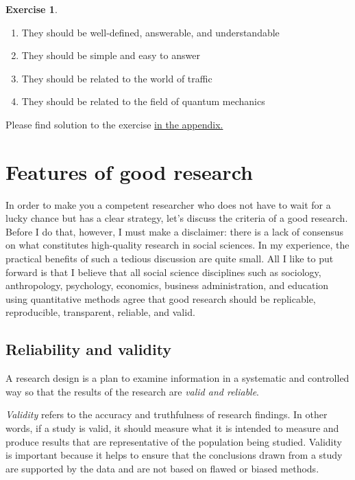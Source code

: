 \documentclass[
  12pt,
  oneside]{book}
\providecommand{\tightlist}{%
  \setlength{\itemsep}{0pt}\setlength{\parskip}{0pt}}
\theoremstyle{definition}
\theoremstyle{definition}
\theoremstyle{definition}
\newtheorem{exercise}{Exercise}[chapter]
\theoremstyle{definition}
\theoremstyle{remark}
\begin{document}
\begin{exercise}
\begin{enumerate}
  \begin{enumerate}
  \def\labelenumii{\alph{enumii})}
  \tightlist
  \item
    They should be well-defined, answerable, and understandable
  \item
    They should be simple and easy to answer
  \item
    They should be related to the world of traffic
  \item
    They should be related to the field of quantum mechanics
  \end{enumerate}
\end{enumerate}

Please find solution to the exercise \protect\hyperlink{sol:effect1u2}{in the appendix.}
\end{exercise}

\hypertarget{features-of-good-research}{%
\section{Features of good research}\label{features-of-good-research}}

In order to make you a competent researcher who does not have to wait for a lucky chance but has a clear strategy, let's discuss the criteria of a good research. Before I do that, however, I must make a disclaimer: there is a lack of consensus on what constitutes high-quality research in social sciences. In my experience, the practical benefits of such a tedious discussion are quite small. All I like to put forward is that I believe that all social science disciplines such as sociology, anthropology, psychology, economics, business administration, and education using quantitative methods agree that good research should be replicable, reproducible, transparent, reliable, and valid.

\hypertarget{reliability-and-validity}{%
\subsection{Reliability and validity}\label{reliability-and-validity}}

A research design is a plan to examine information in a systematic and controlled way so that the results of the research are \emph{valid and reliable}.

\emph{Validity} refers to the accuracy and truthfulness of research findings. In other words, if a study is valid, it should measure what it is intended to measure and produce results that are representative of the population being studied. Validity is important because it helps to ensure that the conclusions drawn from a study are supported by the data and are not based on flawed or biased methods.
\end{document}
